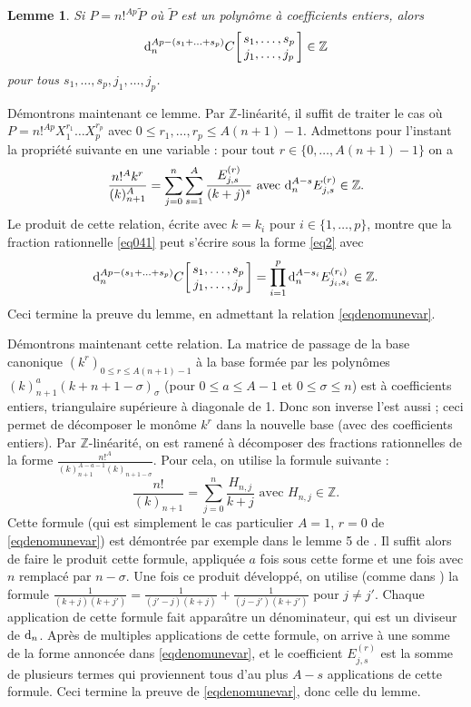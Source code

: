 \documentclass[12pt,francais, reqno]{smfart}
\numberwithin{equation}{section}
\newcommand{\dd}{\textup{d}}
\def\dd{\textup{d}}
\newcommand{\Z}{\mathbb Z}
\newcommand{\cjs}{C\bigg[\,\begin{matrix} s_1, \ldots, s_p\\j_1, \ldots, j_p\end{matrix}\,\bigg]}
\newcommand{\ejsr}{E_{j,s}^{(r)}}
\newcommand{\ejsri}{E_{j_i,s_i}^{(r_i)}}
\newtheorem{Lemme}{Lemme}
\begin{document}
\begin{Lemme} \label{lemdenom} Si $P = n!^{Ap} \widetilde P $ o\`u $\widetilde P $ est un polyn\^ome \`a coefficients entiers, alors 
$$\dd_n ^{Ap - (s_1+\ldots+s_p)} \cjs \in \Z$$
pour tous $s_1, \ldots, s_p, j_1, \ldots, j_p $.
\end{Lemme}

D\'emontrons maintenant ce lemme. Par $\Z$-lin\'earit\'e, il suffit de traiter le cas o\`u $P = n!^{Ap} X_1^{r_1} \ldots X_p^{r_p}$ avec $0 \leq r_1, \ldots, r_p \leq A(n+1)-1$. Admettons pour l'instant la propri\'et\'e suivante en une variable : pour tout $r \in \{0, \ldots, A(n+1)-1\}$ on a 
\begin{equation} \label{eqdenomunevar}
\frac{n! ^A k^r}{(k)_{n+1}^A} = \sum_{j=0}^n \sum_{s=1}^A \frac{\ejsr}{(k+j)^s} 
\mbox{ avec } \dd_n^{A-s} \ejsr \in \Z.
\end{equation}
 Le produit de cette relation, \'ecrite avec $k=k_i$ pour $i \in \{1, \ldots, p\}$, montre que la fraction rationnelle \eqref{eq041} peut s'\'ecrire  sous la forme \eqref{eq2} avec
$$\dd_n^{Ap-(s_1+\ldots+s_p)} \cjs = \prod_{i=1}^p \dd_n^{A-s_i} \ejsri \in \Z.$$
Ceci termine la preuve du lemme, en admettant la relation \eqref{eqdenomunevar}.

D\'emontrons maintenant cette relation. La matrice de passage de la base canonique $(k^r)_{0 \leq r \leq A(n+1)-1}$ \`a la base form\'ee par les polyn\^omes $(k)_{n+1}^a (k+n+1-\sigma)_{\sigma}$ (pour $0 \leq a \leq A-1$ et $0 \leq \sigma \leq n$) est \`a coefficients entiers, triangulaire sup\'erieure \`a diagonale de 1. Donc son inverse l'est aussi ; ceci permet de d\'ecomposer le mon\^ome $k^r$ dans la nouvelle base (avec des coefficients entiers). Par $\Z$-lin\'earit\'e, on est ramen\'e \`a d\'ecomposer des fractions rationnelles de la forme $\frac{n!^A}{(k)_{n+1}^{A-a-1} (k)_{n+1-\sigma}}$. Pour cela, on utilise la formule suivante   :
$$\frac{n!  }{(k)_{n+1}} = \sum_{j=0}^n  \frac{H_{n,j}}{k+j} \mbox{ avec } H_{n,j}  \in \Z.$$
Cette formule (qui est simplement le cas particulier $A=1$, $r=0$ de \eqref{eqdenomunevar}) est 
d\'emontr\'ee par exemple dans le lemme 5 de \cite{BR}. 
Il suffit alors de faire le produit cette formule, appliqu\'ee $a$ fois sous cette forme et une fois avec $n$ remplac\'e par $n-\sigma$. Une fois ce produit d\'evelopp\'e, on utilise (comme dans \cite{Colmez})  la formule $\frac{1}{(k+j)(k+j')} = \frac{1}{(j'-j)(k+j)} + \frac{1}{(j-j')(k+j')}$ pour $j \neq j'$. Chaque application de cette formule fait appara\^{\i}tre un d\'enominateur, qui est un diviseur de $\dd_n$. Apr\`es de multiples applications de cette formule, on arrive \`a une somme de la forme annonc\'ee dans   \eqref{eqdenomunevar}, et le coefficient $\ejsr$ est la somme de plusieurs termes qui proviennent tous d'au plus $A-s$ applications de cette formule. Ceci termine la preuve de \eqref{eqdenomunevar}, donc celle du lemme. 
\end{document}
